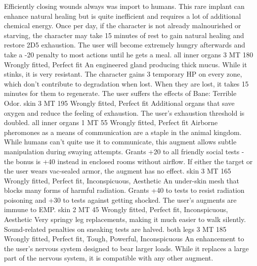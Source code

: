 \begin{multicols}{2}
    {Efficiently closing wounds always was import to humans.
        This rare implant can enhance natural healing
        but is quite inefficient and requires a lot of additional chemical energy.}
    {Once per day, if the character is not already malnourished or starving,
        the character may take 15 minutes of rest to gain natural healing and restore 2D5 exhaustion.
        The user will become extremely hungry afterwards and take a -20 penalty to most actions until he gets a meal.}
    {all inner organs}
    {3 MT}
    {180}
    {Wrongly fitted, Perfect fit}
    {An engineered gland producing thick mucus.
        While it stinks, it is very resistant.}
    {The character gains 3 temporary HP on every zone,
        which don't contribute to degradation when lost.
        When they are lost, it takes 15 minutes for them to regenerate.
        The user suffers the effects of Bane: Terrible Odor.}
    {skin}
    {3 MT}
    {195}
    {Wrongly fitted, Perfect fit}
    {Additional organs that save oxygen and reduce the feeling of exhaustion.}
    {The user's exhaustion threshold is doubled.}
    {all inner organs}
    {1 MT}
    {55}
    {Wrongly fitted, Perfect fit}
    {Airborne pheromones as a means of communication are a staple in the animal kingdom.
        While humans can't quite use it to communicate,
        this augment allows subtle manipulation during swaying attempts.}
    {Grants +20 to all friendly social tests - the bonus is +40 instead in enclosed rooms without airflow.
        If either the target or the user wears vac-sealed armor,
        the augment has no effect.}
    {skin}
    {3 MT}
    {165}
    {Wrongly fitted, Perfect fit, Inconspicuous, Aesthetic}
    {An under-skin mesh that blocks many forms of harmful radiation.}
    {Grants +40 to tests to resist radiation poisoning
        and +30 to tests against getting shocked.
        The user's augments are immune to EMP.}
    {skin}
    {2 MT}
    {45}
    {Wrongly fitted, Perfect fit, Inconspicuous, Aesthetic}
    {Very springy leg replacements, making it much easier to walk silently.}
    {Sound-related penalties on sneaking tests are halved.}
    {both legs}
    {3 MT}
    {185}
    {Wrongly fitted, Perfect fit, Tough, Powerful, Inconspicuous}
    {An enhancement to the user's nervous system designed to bear larger loads.
        While it replaces a large part of the nervous system,
        it is compatible with any other augment.}

\end{multicols}
